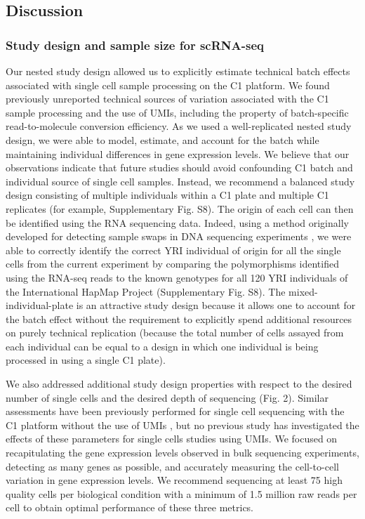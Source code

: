 \subsection{Discussion}\label{discussion}

\subsubsection{Study design and sample size for
scRNA-seq}\label{study-design-and-sample-size-for-scrna-seq}

Our nested study design allowed us to explicitly estimate technical
batch effects associated with single cell sample processing on the C1
platform. We found previously unreported technical sources of variation
associated with the C1 sample processing and the use of UMIs, including
the property of batch-specific read-to-molecule conversion efficiency.
As we used a well-replicated nested study design, we were able to model,
estimate, and account for the batch while maintaining individual
differences in gene expression levels. We believe that our observations
indicate that future studies should avoid confounding C1 batch and
individual source of single cell samples. Instead, we recommend a
balanced study design consisting of multiple individuals within a C1
plate and multiple C1 replicates (for example, Supplementary Fig. S8).
The origin of each cell can then be identified using the RNA sequencing
data. Indeed, using a method originally developed for detecting sample
swaps in DNA sequencing experiments \citep{Jun2012}, we were able to
correctly identify the correct YRI individual of origin for all the
single cells from the current experiment by comparing the polymorphisms
identified using the RNA-seq reads to the known genotypes for all 120
YRI individuals of the International HapMap Project
\citep{HapMapConsortium2005} (Supplementary Fig. S8). The
mixed-individual-plate is an attractive study design because it allows
one to account for the batch effect without the requirement to
explicitly spend additional resources on purely technical replication
(because the total number of cells assayed from each individual can be
equal to a design in which one individual is being processed in using a
single C1 plate).

We also addressed additional study design properties with respect to the
desired number of single cells and the desired depth of sequencing (Fig.
2). Similar assessments have been previously performed for single cell
sequencing with the C1 platform without the use of UMIs \citep{Wu2014,
Pollen2014}, but no previous study has investigated the effects of
these parameters for single cells studies using UMIs. We focused on
recapitulating the gene expression levels observed in bulk sequencing
experiments, detecting as many genes as possible, and accurately
measuring the cell-to-cell variation in gene expression levels. We
recommend sequencing at least 75 high quality cells per biological
condition with a minimum of 1.5 million raw reads per cell to obtain
optimal performance of these three metrics.

